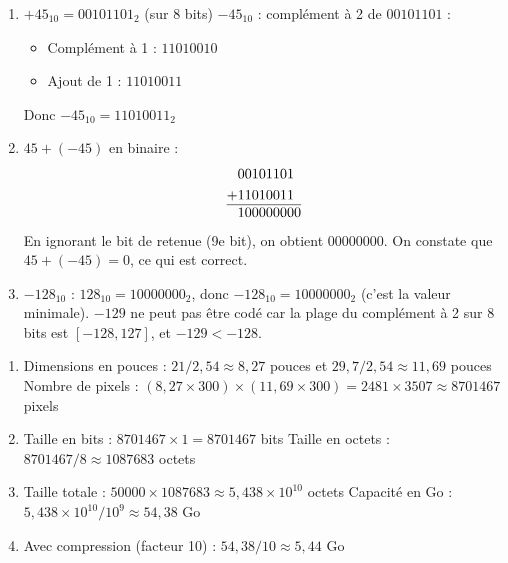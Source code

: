 \begin{enumerate}
    \item $+45_{10} = 00101101_2$ (sur 8 bits)
    $-45_{10}$ : complément à 2 de $00101101$ :
    \begin{itemize}
        \item Complément à 1 : $11010010$
        \item Ajout de 1 : $11010011$
    \end{itemize}
    Donc $-45_{10} = 11010011_2$
    
    \item $45 + (-45)$ en binaire :
    \begin{align*}
        &00101101\\
        +&11010011\\
        \hline
        &100000000
    \end{align*}
    En ignorant le bit de retenue (9e bit), on obtient $00000000$. On constate que $45 + (-45) = 0$, ce qui est correct.
    
    \item $-128_{10}$ : $128_{10} = 10000000_2$, donc $-128_{10} = 10000000_2$ (c'est la valeur minimale).
    $-129$ ne peut pas être codé car la plage du complément à 2 sur 8 bits est $[-128, 127]$, et $-129 < -128$.
\end{enumerate}

\begin{enumerate}
    \item Dimensions en pouces : $21 / 2,54 \approx 8,27$ pouces et $29,7 / 2,54 \approx 11,69$ pouces
    Nombre de pixels : $(8,27 \times 300) \times (11,69 \times 300) = 2481 \times 3507 \approx 8 701 467$ pixels
    
    \item Taille en bits : $8 701 467 \times 1 = 8 701 467$ bits
    Taille en octets : $8 701 467 / 8 \approx 1 087 683$ octets
    
    \item Taille totale : $50 000 \times 1 087 683 \approx 5,438 \times 10^{10}$ octets
    Capacité en Go : $5,438 \times 10^{10} / 10^9 \approx 54,38$ Go
    
    \item Avec compression (facteur 10) : $54,38 / 10 \approx 5,44$ Go
\end{enumerate}